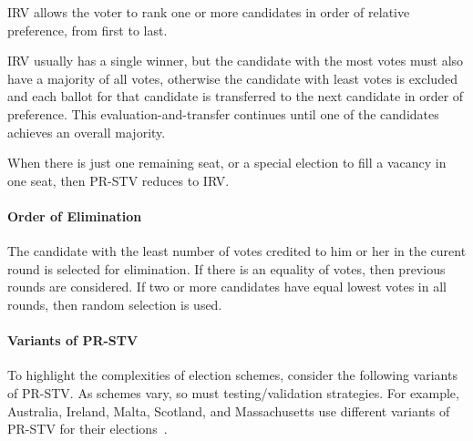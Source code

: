 \documentclass[runningheads,a4paper]{llncs}
\begin{document}
IRV allows the voter to rank one or more candidates in order of
relative preference, from first to last.

IRV usually has a single winner, but the candidate with the most votes
must also have a majority of all votes, otherwise the candidate with
least votes is excluded and each ballot for that candidate is
transferred to the next candidate in order of preference.  This
evaluation-and-transfer continues until one of the candidates achieves
an overall majority.

When there is just one remaining seat, or a special election to fill a
vacancy in one seat, then PR-STV reduces to IRV.

\paragraph{Order of Elimination}

The candidate with the least number of votes credited to him or her in
the curent round is selected for elimination.  If there is an equality
of votes, then previous rounds are considered.  If two or more
candidates have equal lowest votes in all rounds, then random
selection is used.

\paragraph*{Variants of PR-STV}

To highlight the complexities of election schemes, consider the
following variants of PR-STV.  As schemes vary, so must
testing/validation strategies.  For example, Australia, Ireland,
Malta, Scotland, and Massachusetts use different variants of PR-STV
for their elections~\cite{bowler2000elections}.
\end{document}
